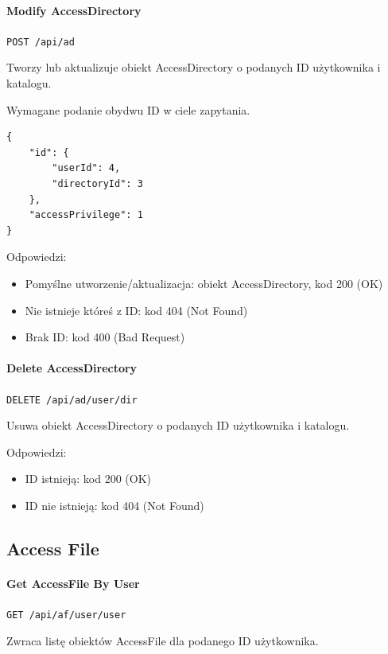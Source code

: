 \documentclass[a4paper,twoside,12pt]{book}
\begin{document}
\paragraph{Modify AccessDirectory}

\texttt{POST /api/ad}

Tworzy lub aktualizuje obiekt AccessDirectory o podanych ID użytkownika i katalogu.

Wymagane podanie obydwu ID w ciele zapytania.

\begin{verbatim}
{
    "id": {
        "userId": 4,
        "directoryId": 3
    },
    "accessPrivilege": 1
}
\end{verbatim}

Odpowiedzi: 
\begin{itemize}
	\item Pomyślne utworzenie/aktualizacja: obiekt AccessDirectory, kod 200 (OK) 
	\item Nie istnieje któreś z ID: kod 404 (Not Found) 
	\item Brak ID: kod 400 (Bad Request)
\end{itemize}

\paragraph{Delete AccessDirectory}

\texttt{DELETE /api/ad/{user}/{dir}}

Usuwa obiekt AccessDirectory o podanych ID użytkownika i katalogu.

Odpowiedzi: 
\begin{itemize}
	\item ID istnieją: kod 200 (OK) 
	\item ID nie istnieją: kod 404 (Not Found)
\end{itemize}

\subsection{Access File}

\paragraph{Get AccessFile By User}

\texttt{GET /api/af/user/{user}}

Zwraca listę obiektów AccessFile dla podanego ID użytkownika.
\end{document}
